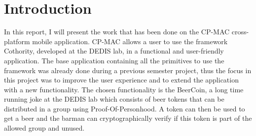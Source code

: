 \section{Introduction}
In this report, I will present the work that has been done on the CP-MAC cross-platform mobile application. CP-MAC allows a user to use the framework Cothority, developed at the DEDIS lab, in a functional and user-friendly application. The base application containing all the primitives to use the framework was already done during a previous semester project, thus the focus in this project was to improve the user experience and to extend the application with a new functionality. The chosen functionality is the BeerCoin, a long time running joke at the DEDIS lab which consists of beer tokens that can be distributed in a group using Proof-Of-Personhood. A token can then be used to get a beer and the barman can cryptographically verify if this token is part of the allowed group and unused.
